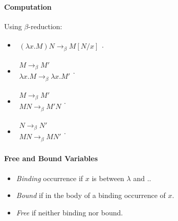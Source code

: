 \documentclass[twocolumn,english]{article}
\begin{document}
\paragraph{Computation}

Using $\beta$-reduction:
\begin{itemize}
\item $\begin{array}{c}
\\
\hline \left(\lambda x.M\right)N\rightarrow_{\beta}M\left[N/x\right]
\end{array}$.
\item $\begin{array}{c}
M\rightarrow_{\beta}M'\\
\hline \lambda x.M\rightarrow_{\beta}\lambda x.M'
\end{array}$.
\item $\begin{array}{c}
M\rightarrow_{\beta}M'\\
\hline MN\rightarrow_{\beta}M'N
\end{array}$.
\item $\begin{array}{c}
N\rightarrow_{\beta}N'\\
\hline MN\rightarrow_{\beta}MN'
\end{array}$.
\end{itemize}

\paragraph{Free and Bound Variables}
\begin{itemize}
\item \emph{Binding} occurrence if $x$ is between $\lambda$ and $.$.
\item \emph{Bound} if in the body of a binding occurrence of $x$.
\item \emph{Free} if neither binding nor bound.
\end{itemize}
\end{document}

